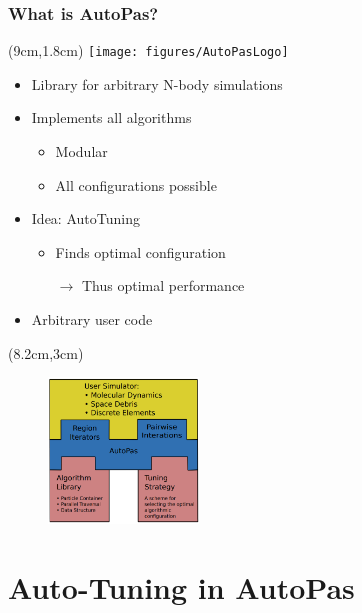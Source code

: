\documentclass[
	10pt,
	t		%
]{beamer}
\begin{document}
\begin{frame}
    \frametitle{What is AutoPas?}

    \begin{textblock*}{5cm}(9cm,1.8cm)
        \texttt{[image: figures/AutoPasLogo]}
    \end{textblock*}

    \begin{itemize}
        \item Library for arbitrary N-body simulations
        \item Implements all algorithms
              \begin{itemize}
                  \item Modular
                  \item All\textup{\small*} configurations possible
              \end{itemize}
        \item Idea: AutoTuning
              \begin{itemize}
                  \item Finds optimal configuration
                  \item[$\rightarrow$] Thus optimal performance
              \end{itemize}
        \item Arbitrary user code
    \end{itemize}

    \begin{textblock*}{4cm}(8.2cm,3cm)
        \begin{figure}
            \includegraphics[width=4cm]{figures/AutoPasLibraryStructure.png}
            \caption{ \scriptsize{\cite{Newcome2023Poster}}}

        \end{figure}
    \end{textblock*}

\end{frame}



\section{Auto-Tuning in AutoPas}
\end{document}
